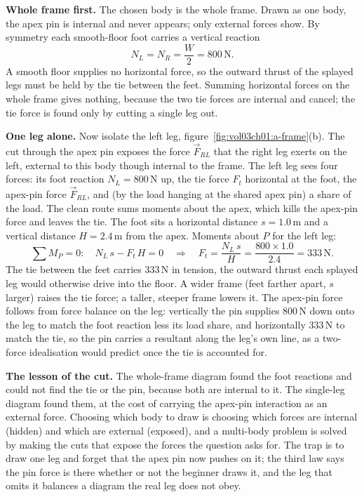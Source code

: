 \textbf{Whole frame first.} The chosen body is the whole frame. Drawn as one
body, the apex pin is internal and never appears; only external forces show.
By symmetry each smooth-floor foot carries a vertical reaction
\[
N_L = N_R = \frac{W}{2} = 800\,\text{N}.
\]
A smooth floor supplies no horizontal force, so the outward thrust of the
splayed legs must be held by the tie between the feet. Summing horizontal
forces on the whole frame gives nothing, because the two tie forces are
internal and cancel; the tie force is found only by cutting a single leg out.

\textbf{One leg alone.} Now isolate the left leg, figure~\ref{fig:vol03ch01:a-frame}(b).
The cut through the apex pin exposes the force $\vec{F}_{RL}$ that the right leg
exerts on the left, external to this body though internal to the frame. The
left leg sees four forces: its foot reaction $N_L = 800\,\text{N}$ up, the tie
force $F_t$ horizontal at the foot, the apex-pin force $\vec{F}_{RL}$, and (by
the load hanging at the shared apex pin) a share of the load. The clean route
sums moments about the apex, which kills the apex-pin force and leaves the tie.
The foot sits a horizontal distance $s = 1.0\,\si{\meter}$ and a vertical
distance $H = 2.4\,\si{\meter}$ from the apex. Moments about $P$ for the left
leg:
\[
\sum M_P = 0: \quad N_L\,s - F_t\,H = 0
\quad\Longrightarrow\quad
F_t = \frac{N_L\,s}{H} = \frac{800 \times 1.0}{2.4} = 333\,\text{N}.
\]
The tie between the feet carries $333\,\text{N}$ in tension, the outward thrust
each splayed leg would otherwise drive into the floor. A wider frame (feet
farther apart, $s$ larger) raises the tie force; a taller, steeper frame lowers
it. The apex-pin force follows from force balance on the leg: vertically the
pin supplies $800\,\text{N}$ down onto the leg to match the foot reaction less
its load share, and horizontally $333\,\text{N}$ to match the tie, so the pin
carries a resultant along the leg's own line, as a two-force idealisation would
predict once the tie is accounted for.

\textbf{The lesson of the cut.} The whole-frame diagram found the foot
reactions and could not find the tie or the pin, because both are internal to
it. The single-leg diagram found them, at the cost of carrying the apex-pin
interaction as an external force. Choosing which body to draw is choosing which
forces are internal (hidden) and which are external (exposed), and a
multi-body problem is solved by making the cuts that expose the forces the
question asks for. The trap is to draw one leg and forget that the apex pin now
pushes on it; the third law says the pin force is there whether or not the
beginner draws it, and the leg that omits it balances a diagram the real leg
does not obey.

